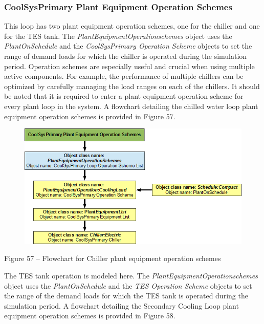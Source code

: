 \subsubsection{CoolSysPrimary Plant Equipment Operation Schemes}\label{coolsysprimary-plant-equipment-operation-schemes}

This loop has two plant equipment operation schemes, one for the chiller and one for the TES tank. The \emph{PlantEquipmentOperationschemes} object uses the \emph{PlantOnSchedule} and the \emph{CoolSysPrimary Operation Scheme} objects to set the range of demand loads for which the chiller is operated during the simulation period. Operation schemes are especially useful and crucial when using multiple active components. For example, the performance of multiple chillers can be optimized by carefully managing the load ranges on each of the chillers. It should be noted that it is required to enter a plant equipment operation scheme for every plant loop in the system. A flowchart detailing the chilled water loop plant equipment operation schemes is provided in Figure 57.

\begin{figure}[htbp]
\centering
\includegraphics{media/image057.png}
\caption{}
\end{figure}

Figure 57 -- Flowchart for Chiller plant equipment operation schemes

The TES tank operation is modeled here. The \emph{PlantEquipmentOperationschemes} object uses the \emph{PlantOnSchedule} and the \emph{TES Operation Scheme} objects to set the range of the demand loads for which the TES tank is operated during the simulation period. A flowchart detailing the Secondary Cooling Loop plant equipment operation schemes is provided in Figure 58.

